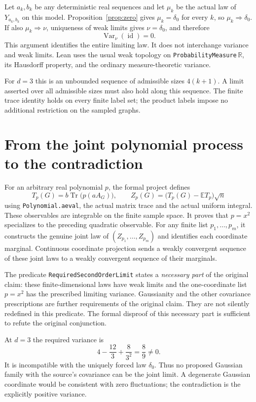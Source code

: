 \documentclass[11pt]{article}
\newcommand{\Tr}{\operatorname{Tr}}
\newcommand{\Var}{\operatorname{Var}}
\newcommand{\E}{\mathbb E}
\newcommand{\lean}[1]{\nolinkurl{#1}}
\begin{document}
Let $a_k,b_k$ be any deterministic real sequences and let $\mu_k$ be the
actual law of $Y_{a_k,b_k}$ on this model. Proposition~\ref{prop:zero} gives
$\mu_k=\delta_0$ for every $k$, so $\mu_k\Rightarrow\delta_0$. If also
$\mu_k\Rightarrow\nu$, uniqueness of weak limits gives $\nu=\delta_0$, and
therefore
\[
 \Var_{\nu}(\operatorname{id})=0.
\]
This argument identifies the entire limiting law. It does not interchange
variance and weak limits. Lean uses the usual weak topology on
\lean{ProbabilityMeasure}\,$\mathbb R$, its Hausdorff property, and the
ordinary measure-theoretic variance.

For $d=3$ this is an unbounded sequence of admissible sizes $4(k+1)$. A limit
asserted over all admissible sizes must also hold along this sequence.
The finite trace identity holds on every finite label set; the product labels
impose no additional restriction on the sampled graphs.

\section{From the joint polynomial process to the contradiction}
For an arbitrary real polynomial $p$, the formal project defines
\[
 T_p(G)=b\Tr\bigl(p(aA_G)\bigr),\qquad
 Z_p(G)=\bigl(T_p(G)-\E T_p\bigr)\sqrt n
\]
using \lean{Polynomial.aeval}, the actual matrix trace and the actual uniform
integral. These observables are integrable on the finite sample space.
It proves that $p=x^2$ specializes to the preceding quadratic observable.
For any finite list $p_1,\ldots,p_m$, it constructs the genuine joint law of
$(Z_{p_1},\ldots,Z_{p_m})$ and identifies each coordinate marginal.
Continuous coordinate projection sends a weakly convergent sequence of these
joint laws to a weakly convergent sequence of their marginals.

The predicate \lean{RequiredSecondOrderLimit} states a \emph{necessary part}
of the original claim: these finite-dimensional laws have weak limits and
the one-coordinate list $p=x^2$ has the prescribed limiting variance.
Gaussianity and the other covariance prescriptions are further requirements
of the original claim. They are not silently redefined in this predicate.
The formal disproof of this necessary part is sufficient to refute the
original conjunction.

At $d=3$ the required variance is
\[
 4-\frac{12}{3}+\frac{8}{3^2}=\frac89\ne0.
\]
It is incompatible with the uniquely forced law $\delta_0$. Thus no proposed
Gaussian family with the source's covariance can be the joint limit.
A degenerate Gaussian coordinate would be consistent with zero fluctuations;
the contradiction is the explicitly positive variance.
\end{document}
